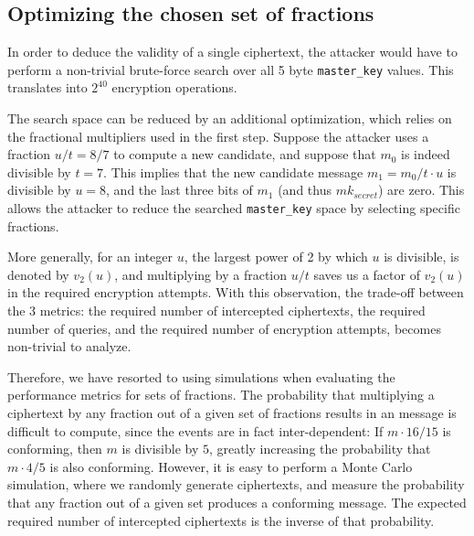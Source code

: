\subsection{Optimizing the chosen set of fractions}
\label{sec:fraction-optimization}

In order to deduce the validity of a single ciphertext, the attacker would have to perform a non-trivial brute-force search over all 5 byte \texttt{master\_key} values. This translates into $2^{40}$ encryption operations.

The search space can be reduced by an additional optimization, which relies on the fractional multipliers used in the first step.
Suppose the attacker uses a fraction $u/t=8/7$ to compute a new \sslconform candidate, and suppose that $m_0$ is indeed divisible by $t=7$. 
This implies that the new candidate message $m_1 = m_0 / t \cdot u$ is divisible by $u=8$, and the last three bits of $m_1$ (and thus \texttt{$mk_{secret}$}) are zero. 
This allows the attacker to reduce the searched \texttt{master\_key} space by selecting specific fractions.


More generally, for an integer $u$, the largest power of 2 by which $u$ is divisible, is denoted by $v_2(u)$, and multiplying by a fraction $u/t$ saves us a factor of $v_2(u)$ in the required encryption attempts.
With this observation, the trade-off between the 3 metrics: the required number of intercepted ciphertexts, the required number of queries, and the required number of encryption attempts, becomes non-trivial to analyze.

Therefore, we have resorted to using simulations when evaluating the performance metrics for sets of fractions.
The probability that multiplying a ciphertext by any fraction out of a given set of fractions results in an \sslconform message is difficult to compute, since the events are in fact inter-dependent: If $m \cdot 16/15$ is conforming, then $m$ is divisible by $5$, greatly increasing the probability that $m \cdot 4/5$ is also conforming.
However, it is easy to perform a Monte Carlo simulation, where we randomly generate ciphertexts, and measure the probability that any fraction out of a given set produces a conforming message.
The expected required number of intercepted ciphertexts is the inverse of that probability.

